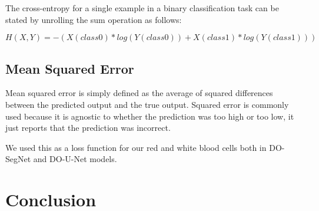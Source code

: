 The cross-entropy for a single example in a binary classification task can be stated by unrolling the sum operation as follows:

\begin{equation}
    H(X, Y) = - (X(class0) * log(Y(class0)) + X(class1) * log(Y(class1)))
\end{equation}

\subsection{Mean Squared Error}
Mean squared error is simply defined as the average of squared differences between the predicted output and the true output. Squared error is commonly used because it is agnostic to whether the prediction was too high or too low, it just reports that the prediction was incorrect.

We used this as a loss function for our red and white blood cells both in DO-SegNet and DO-U-Net models.

\section{Conclusion}
\vspace{0.2in}
\hspace*{0.16in}

\newpage
